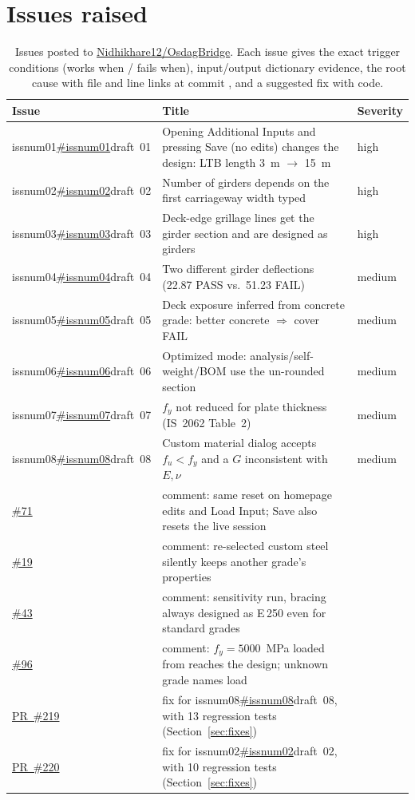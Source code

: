 \documentclass[11pt,a4paper]{article}
\newcommand{\code}[1]{\texttt{\detokenize{#1}}}
\newcommand{\upstream}{\href{https://github.com/Nidhikhare12/OsdagBridge}{Nidhikhare12/OsdagBridge}}
\newcommand{\issue}[1]{\ifcsname issnum#1\endcsname\href{https://github.com/Nidhikhare12/OsdagBridge/issues/\csname issnum#1\endcsname}{\#\csname issnum#1\endcsname}\else draft~#1\fi}
\newcommand{\gh}[1]{\href{https://github.com/Nidhikhare12/OsdagBridge/issues/#1}{\##1}}
\newcommand{\pr}[1]{\href{https://github.com/Nidhikhare12/OsdagBridge/pull/#1}{PR~\##1}}
\begin{document}
\section{Issues raised}\label{sec:issues}
\begin{table}[H]\centering\small
\caption{Issues posted to \upstream. Each issue gives the exact trigger conditions (works when / fails when), input/output dictionary evidence, the root cause with file and line links at commit \code{d74f56d}, and a suggested fix with code.}\label{tab:issues}
\begin{tabularx}{\linewidth}{@{}lXl@{}}
\toprule
Issue & Title & Severity\\
\midrule
\issue{01} & Opening Additional Inputs and pressing Save (no edits) changes the design: LTB length 3~m $\to$ 15~m & high\\
\issue{02} & Number of girders depends on the first carriageway width typed & high\\
\issue{03} & Deck-edge grillage lines get the girder section and are designed as girders & high\\
\issue{04} & Two different girder deflections (22.87 PASS vs.\ 51.23 FAIL) & medium\\
\issue{05} & Deck exposure inferred from concrete grade: better concrete $\Rightarrow$ cover FAIL & medium\\
\issue{06} & Optimized mode: analysis/self-weight/BOM use the un-rounded section & medium\\
\issue{07} & $f_y$ not reduced for plate thickness (IS~2062 Table~2) & medium\\
\issue{08} & Custom material dialog accepts $f_u<f_y$ and a $G$ inconsistent with $E,\nu$ & medium\\
\midrule
\gh{71} & comment: same reset on homepage edits and Load Input; Save also resets the live session & \\
\gh{19} & comment: re-selected custom steel silently keeps another grade's properties & \\
\gh{43} & comment: sensitivity run, bracing always designed as E\,250 even for standard grades & \\
\gh{96} & comment: $f_y=5000$~MPa loaded from \code{.osi} reaches the design; unknown grade names load & \\
\midrule
\pr{219} & fix for \issue{08}, with 13 regression tests (Section~\ref{sec:fixes}) & \\
\pr{220} & fix for \issue{02}, with 10 regression tests (Section~\ref{sec:fixes}) & \\
\bottomrule
\end{tabularx}
\end{table}
\end{document}

